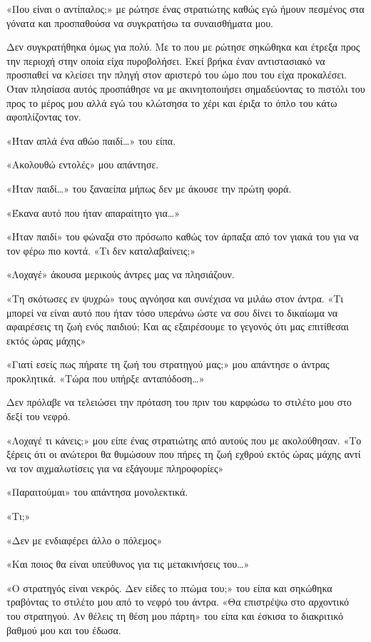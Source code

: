 \documentclass[12pt,twoside, openany]{book}
\begin{document}
«Που είναι ο αντίπαλος;» με ρώτησε ένας στρατιώτης καθώς εγώ ήμουν πεσμένος στα γόνατα και προσπαθούσα να συγκρατήσω τα συναισθήματα μου.

Δεν συγκρατήθηκα όμως για πολύ. Με το που με ρώτησε σηκώθηκα και έτρεξα προς την περιοχή στην οποία είχα πυροβολήσει. Εκεί βρήκα έναν αντιστασιακό να προσπαθεί να κλείσει την πληγή στον αριστερό του ώμο που του είχα προκαλέσει. Όταν πλησίασα αυτός προσπάθησε να με ακινητοποιήσει σημαδεύοντας το πιστόλι του προς το μέρος μου αλλά εγώ του κλώτσησα το χέρι και έριξα το όπλο του κάτω αφοπλίζοντας τον.

«Ήταν απλά ένα αθώο παιδί…» του είπα.

«Ακολουθώ εντολές» μου απάντησε.

«Ήταν παιδί…» του ξαναείπα μήπως δεν με άκουσε την πρώτη φορά.

«Έκανα αυτό που ήταν απαραίτητο για…»

«Ήταν παιδί» του φώναξα στο πρόσωπο καθώς τον άρπαξα από τον γιακά του για να τον φέρω πιο κοντά. «Τι δεν καταλαβαίνεις;»

«Λοχαγέ» άκουσα μερικούς άντρες μας να πλησιάζουν.

«Τη σκότωσες εν ψυχρώ» τους αγνόησα και συνέχισα να μιλάω στον άντρα. «Τι μπορεί να είναι αυτό που ήταν τόσο υπεράνω ώστε να σου δίνει το δικαίωμα να αφαιρέσεις τη ζωή ενός παιδιού; Και ας εξαιρέσουμε το γεγονός ότι μας επιτίθεσαι εκτός ώρας μάχης»

«Γιατί εσείς πως πήρατε τη ζωή του στρατηγού μας;» μου απάντησε ο άντρας προκλητικά. «Τώρα που υπήρξε ανταπόδοση…»

Δεν πρόλαβε να τελειώσει την πρόταση του πριν του καρφώσω το στιλέτο μου στο δεξί του νεφρό.

«Λοχαγέ τι κάνεις;» μου είπε ένας στρατιώτης από αυτούς που με ακολούθησαν. «Το ξέρεις ότι οι ανώτεροι θα θυμώσουν που πήρες τη ζωή εχθρού εκτός ώρας μάχης αντί να τον αιχμαλωτίσεις για να εξάγουμε πληροφορίες»

«Παραιτούμαι» του απάντησα μονολεκτικά.

«Τι;»

«Δεν με ενδιαφέρει άλλο ο πόλεμος»

«Και ποιος θα είναι υπεύθυνος για τις μετακινήσεις του…»

«Ο στρατηγός είναι νεκρός. Δεν είδες το πτώμα του;» του είπα και σηκώθηκα τραβόντας το στιλέτο μου από το νεφρό του άντρα. «Θα επιστρέψω στο αρχοντικό του στρατηγού. Αν θέλεις τη θέση μου πάρτη» του είπα και έσκισα το διακριτικό βαθμού μου και του έδωσα.\newline\newline
\end{document}
